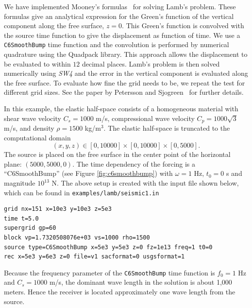 \documentclass[11pt]{report}
\begin{document}
{We have implemented Mooney's formulas~\cite{Mooney_1974} for solving Lamb's problem. These formulas
give an analytical expression for the Green's function of the vertical component along the free
surface, $z=0$. This Green's function is convolved with the source time function to give the
displacement as function of time. We use a {\tt C6SmoothBump} time function and the convolution is
performed by numerical quadrature using the Quadpack library. This approach allows the displacement
to be evaluated to within $12$ decimal places. Lamb's problem is then solved numerically using
\emph{SW4} and the error in the vertical component is evaluated along the free surface. To evaluate
how fine the grid needs to be, we repeat the test for different grid sizes. See the paper by
Petersson and Sjogreen~\cite{PetSjo-14} for further details.

In this example, the elastic half-space consists of a homogeneous material with shear wave
velocity $C_s=1000$ m/s, compressional wave velocity $C_p=1000\sqrt{3}$ m/s, and density $\rho=1500$
kg/m$^3$. The elastic half-space is truncated to the computational domain
\[
	(x,y,z) \in [0,10000] \times [0,10000]\times[0,5000].
\]
The source is placed on the free surface in the center point of the horizontal plane:
$(5000,5000,0)$. The time dependency of the forcing is a ``C6SmoothBump'' (see Figure
\ref{fig:c6smoothbump}) with $\omega=1$ Hz, $t_0=0$ s and magnitude $10^{13}$ N. The above setup is
created with the input file shown below, which can be found in {\tt examples/lamb/seismic1.in}
\begin{verbatim}
grid nx=151 x=10e3 y=10e3 z=5e3
time t=5.0
supergrid gp=60
block vp=1.7320508076e+03 vs=1000 rho=1500
source type=C6SmoothBump x=5e3 y=5e3 z=0 fz=1e13 freq=1 t0=0
rec x=5e3 y=6e3 z=0 file=v1 sacformat=0 usgsformat=1
\end{verbatim}
Because the frequency parameter of the {\tt C6SmoothBump} time function is $f_0=1$ Hz and $C_s=1000$
m/s, the dominant wave length in the solution is about 1,000 meters. Hence the receiver is located
approximately one wave length from the source.

}
\end{document}
